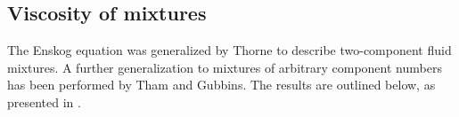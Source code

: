
\subsection{Viscosity of mixtures}
The Enskog equation was generalized by Thorne to describe 
two-component fluid mixtures\cite{ref:chapman:non_uniform_gases}.
A further generalization to mixtures of arbitrary component numbers 
has been performed by Tham and Gubbins\cite{ref:tham:fluid_mixtures}.
The results are outlined below, as presented in \cite{ref:pippo:composition_dependence}.

